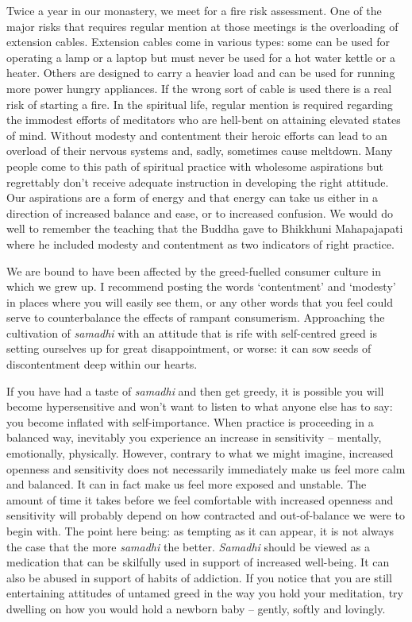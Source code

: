 Twice a year in our monastery, we meet for a fire risk assessment. One
of the major risks that requires regular mention at those meetings is
the overloading of extension cables. Extension cables come in various
types: some can be used for operating a lamp or a laptop but must never
be used for a hot water kettle or a heater. Others are designed to carry
a heavier load and can be used for running more power hungry appliances.
If the wrong sort of cable is used there is a real risk of starting a
fire. In the spiritual life, regular mention is required regarding the
immodest efforts of meditators who are hell-bent on attaining elevated
states of mind. Without modesty and contentment their heroic efforts can
lead to an overload of their nervous systems and, sadly, sometimes cause
meltdown. Many people come to this path of spiritual practice with
wholesome aspirations but regrettably don't receive adequate instruction
in developing the right attitude. Our aspirations are a form of energy
and that energy can take us either in a direction of increased balance
and ease, or to increased confusion. We would do well to remember the
teaching that the Buddha gave to Bhikkhuni Mahapajapati where he
included modesty and contentment as two indicators of right practice.

We are bound to have been affected by the greed-fuelled consumer culture
in which we grew up. I recommend posting the words `contentment' and
`modesty' in places where you will easily see them, or any other words
that you feel could serve to counterbalance the effects of rampant
consumerism. Approaching the cultivation of \emph{samadhi} with an attitude
that is rife with self-centred greed is setting ourselves up for great
disappointment, or worse: it can sow seeds of discontentment deep within
our hearts.

If you have had a taste of \emph{samadhi} and then get greedy, it is possible
you will become hypersensitive and won't want to listen to what anyone
else has to say: you become inflated with self-importance. When practice
is proceeding in a balanced way, inevitably you experience an increase
in sensitivity -- mentally, emotionally, physically. However, contrary to
what we might imagine, increased openness and sensitivity does not
necessarily immediately make us feel more calm and balanced. It can in
fact make us feel more exposed and unstable. The amount of time it takes
before we feel comfortable with increased openness and sensitivity will
probably depend on how contracted and out-of-balance we were to begin
with. The point here being: as tempting as it can appear, it is not
always the case that the more \emph{samadhi} the better. \emph{Samadhi} should be
viewed as a medication that can be skilfully used in support of
increased well-being. It can also be abused in support of habits of
addiction. If you notice that you are still entertaining attitudes of
untamed greed in the way you hold your meditation, try dwelling on how
you would hold a newborn baby -- gently, softly and lovingly.

